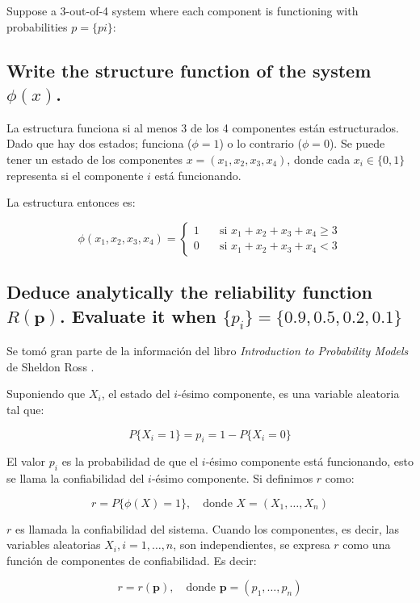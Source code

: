 \documentclass[12pt]{article}\usepackage[]{graphicx}\usepackage[]{xcolor}
\begin{document}
Suppose a 3-out-of-4 system where each component is functioning with probabilities $p = \{pi\}$:


\subsection{Write the structure function of the system $\phi(x)$.}

La estructura funciona si al menos 3 de los 4 componentes están estructurados. Dado que hay dos estados; funciona ($\phi = 1$) o lo contrario ($\phi = 0$). Se puede tener un estado de los componentes $x = (x_{1}, x_{2}, x_{3}, x_{4})$, donde cada $x_{i} \in \{0, 1 \}$ representa si el componente $i$ está funcionando.

La estructura entonces es:

\[
\phi (x_{1}, x_{2}, x_{3}, x_{4}) =
\begin{cases}
  1 & \quad \text{si } x_{1} + x_{2} + x_{3} + x_{4} \geq 3 \\
  0 & \quad \text{si } x_{1} + x_{2} + x_{3} + x_{4} < 3
\end{cases}
\]

\subsection{Deduce analytically the reliability function $R(\mathbf{p})$. Evaluate it when $\{p_{i} \} = \{0.9, 0.5, 0.2, 0.1\} $}
\label{subsec:p6-b}

Se tomó gran parte de la información del libro \textit{Introduction to Probability Models} de Sheldon Ross \cite{ross2014introduction}.


Suponiendo que $X_{i}$, el estado del $i$-ésimo componente, es una variable aleatoria tal que:

\[
P\{X_{i} = 1 \} = p_{i} = 1 - P\{X_{i} = 0 \}
\]

El valor $p_{i}$ es la probabilidad de que el $i$-ésimo componente está funcionando, esto se llama la confiabilidad del $i$-ésimo componente. Si definimos $r$ como:

\[
r = P\{\phi (X) = 1 \}, \quad \text{donde } X = (X_{1}, \dots, X_{n})
\]

$r$ es llamada la confiabilidad del sistema. Cuando los componentes, es decir, las variables aleatorias $X_{i}, i = 1, \dots, n$, son independientes, se expresa $r$ como una función de componentes de confiabilidad. Es decir:

\[
r = r (\mathbf{p}), \quad \text{donde } \mathbf{p} = (p_{1}, \dots, p_{n})
\]
\end{document}
